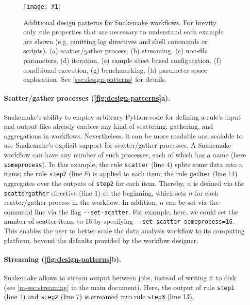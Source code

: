\documentclass[10pt,a4paper,twocolumn]{article}
\newcommand{\image}[1]{\centering\texttt{[image: \#1]}}
\begin{document}
\begin{figure*}
	\image{design-patterns.pdf}
	\caption{Additional design patterns for Snakemake workflows.
		For brevity only rule properties that are necessary to understand each example are shown (e.g. omitting log directives and shell commands or scripts).
		(a) scatter/gather process, (b) streaming, (c) non-file parameters, (d) iteration, (e) sample sheet based configuration, (f) conditional execution, (g) benchmarking, (h) parameter space exploration.
		See \autoref{sec:design-patterns} for details.
	}\label{fig:design-patterns}
\end{figure*}

\paragraph{Scatter/gather processes (\autoref{fig:design-patterns}a).}
Snakemake's ability to employ arbitrary Python code for defining a rule's input and output files already enables any kind of scattering, gathering, and aggregations in workflows.
Nevertheless, it can be more readable and scalable to use Snakemake's explicit support for scatter/gather processes.
A Snakemake workflow can have any number of such processes, each of which has a name (here \lstinline!someprocess!).
In this example, the rule \lstinline!scatter! (line 4) splits some data into $n$ items; the rule \lstinline!step2! (line 8) is applied to each item; the rule \lstinline!gather! (line 14) aggregates over the outputs of \lstinline!step2! for each item.
Thereby, $n$ is defined via the \lstinline!scattergather! directive (line 1) at the beginning, which sets $n$ for each scatter/gather process in the workflow.
In addition, $n$ can be set via the command line via the flag \lstinline!--set-scatter!.
For example, here, we could set the number of scatter items to 16 by specifying \lstinline!--set-scatter someprocess=16!.
This enables the user to better scale the data analysis workflow to its computing platform, beyond the defaults provided by the workflow designer.

\paragraph{Streaming (\autoref{fig:design-patterns}b).}
Snakemake allows to stream output between jobs, instead of writing it to disk (see \autoref{m-sec:streaming} in the main document).
Here, the output of rule \lstinline!step1! (line 1) and \lstinline!step2! (line 7) is streamed into rule \lstinline!step3! (line 13).
\end{document}
